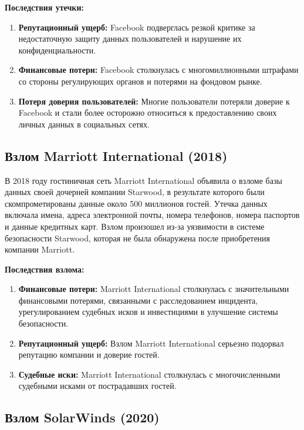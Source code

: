 \documentclass[a4paper,12pt]{diplom}
\begin{document}
	 \textbf{Последствия утечки:}
	 
	 \begin{enumerate}[label=\arabic{enumi})]
	 	\item \textbf{Репутационный ущерб:}  Facebook подверглась резкой критике за недостаточную защиту данных пользователей и нарушение их конфиденциальности.
	 	\item \textbf{Финансовые потери:}  Facebook столкнулась с многомиллионными штрафами со стороны регулирующих органов и потерями на фондовом рынке.
	 	\item \textbf{Потеря доверия пользователей:}  Многие пользователи потеряли доверие к Facebook и стали более осторожно относиться к предоставлению своих личных данных в социальных сетях.
	 \end{enumerate}
	 
	 \subsection{Взлом Marriott International (2018)}
	 
	 В 2018 году гостиничная сеть Marriott International объявила о взломе базы данных своей дочерней компании Starwood, в результате которого были скомпрометированы данные около 500 миллионов гостей.  Утечка данных включала имена, адреса электронной почты, номера телефонов, номера паспортов и данные кредитных карт.  Взлом произошел из-за уязвимости в системе безопасности Starwood, которая не была обнаружена после приобретения компании Marriott.\cite{Marriott_International_attack}
	 
	 \textbf{Последствия взлома:}
	 
	 \begin{enumerate}[label=\arabic{enumi})]
	 	\item \textbf{Финансовые потери:}  Marriott International столкнулась с значительными финансовыми потерями, связанными с расследованием инцидента, урегулированием судебных исков и инвестициями в улучшение системы безопасности.
	 	\item \textbf{Репутационный ущерб:}  Взлом Marriott International серьезно подорвал репутацию компании и доверие гостей.
	 	\item \textbf{Судебные иски:}  Marriott International столкнулась с многочисленными судебными исками от пострадавших гостей.
	 \end{enumerate}
	 
	 \subsection{Взлом SolarWinds (2020)}
	 
\end{document}
